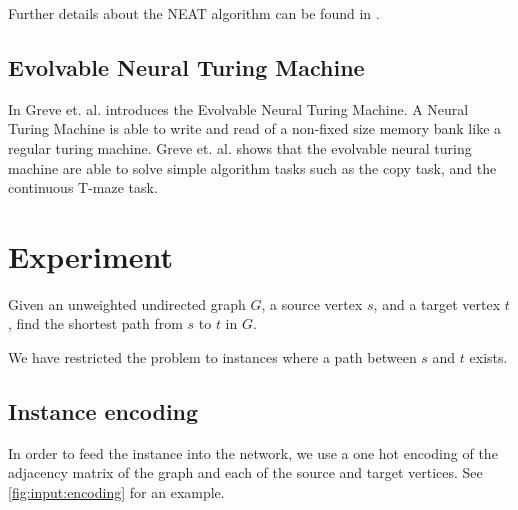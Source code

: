 \documentclass{article}
\newcommand{\newpar}{\bigskip\noindent}
\begin{document}
\newpar Further details about the NEAT algorithm can be found in \cite{stanley2002evolving}.

\subsection{Evolvable Neural Turing Machine}
In  Greve et. al. introduces the Evolvable Neural Turing Machine. A Neural Turing Machine is able to write and read of a non-fixed size memory bank like a regular turing machine. Greve et. al. shows that the evolvable neural turing machine are able to solve simple algorithm tasks such as the copy task, and the continuous T-maze task.

\section{Experiment}
Given an unweighted undirected graph $G$, a source vertex $s$, and a target vertex $t$, find the shortest path from $s$ to $t$ in $G$.

\newpar We have restricted the problem to instances where a path between $s$ and $t$ exists.

\subsection{Instance encoding}
In order to feed the instance into the network, we use a one hot encoding of the adjacency matrix of the graph and each of the source and target vertices. See \autoref{fig:input:encoding} for an example.
\end{document}
